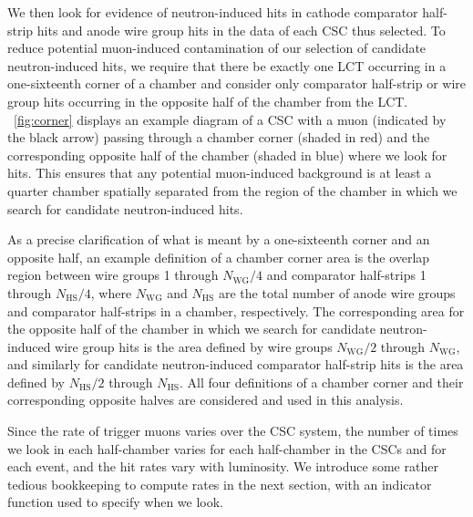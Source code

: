 We then look for evidence of neutron-induced hits in cathode comparator half-strip hits and anode wire group hits in the data of each CSC thus selected. To reduce potential muon-induced contamination of our selection of candidate neutron-induced hits, we require that there be exactly one LCT occurring in a one-sixteenth corner of a chamber and consider only comparator half-strip or wire group hits occurring in the opposite half of the chamber from the LCT. \Fig~\ref{fig:corner} displays an example diagram of a CSC with a muon (indicated by the black arrow) passing through a chamber corner (shaded in red) and the corresponding opposite half of the chamber (shaded in blue) where we look for hits. This ensures that any potential muon-induced background is at least a quarter chamber spatially separated from the region of the chamber in which we search for candidate neutron-induced hits.

As a precise clarification of what is meant by a one-sixteenth corner and an opposite half, an example definition of a chamber corner area is the overlap region between wire groups 1 through $N_\text{WG} / 4$ and comparator half-strips 1 through $N_\text{HS}/4$, where $N_\text{WG}$ and $N_\text{HS}$ are the total number of anode wire groups and comparator half-strips in a chamber, respectively. The corresponding area for the opposite half of the chamber in which we search for candidate neutron-induced wire group hits is the area defined by wire groups $N_\text{WG}/2$ through $N_\text{WG}$, and similarly for candidate neutron-induced comparator half-strip hits is the area defined by $N_\text{HS}/2$ through $N_\text{HS}$. All four definitions of a chamber corner and their corresponding opposite halves are considered and used in this analysis. 

Since the rate of trigger muons varies over the CSC system, 
the number of times we look in each half-chamber varies for each
half-chamber in the CSCs and for each event, and the hit rates vary with
luminosity. We introduce some rather tedious bookkeeping to
compute rates in the next section, with an indicator function used
to specify when we look.

